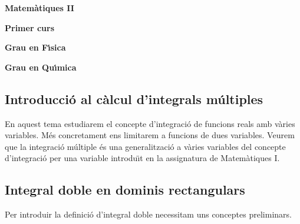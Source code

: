 \documentclass[12pt]{article}
\begin{document}
\vspace*{7cm}
\begin{center}
\textbf{\Huge{Matem{\`a}tiques II}}

\vspace*{2cm}\textbf{\LARGE{Primer curs}}

\vspace*{2cm}\textbf{\LARGE{Grau en F{\'\i}sica}}

\vspace*{0.6cm}\textbf{\LARGE{Grau en Qu{\'\i}mica}}
\end{center}

\thispagestyle{empty}

\newpage

%
%




\begin{center}
\section{Introducci{\'o} al c{\`a}lcul d'integrals m{\'u}ltiples}
\end{center}

\parskip =0.3cm
\parindent =0cm
\itemindent=2cm

En aquest tema estudiarem el concepte d'integraci{\'o} de funcions reals
amb v{\`a}ries variables. M{\'e}s concretament ens limitarem
a funcions de dues variables.
Veurem que la integraci{\'o} m{\'u}ltiple {\'e}s una generalitzaci{\'o} a
v{\`a}ries variables del concepte d'integraci{\'o} per una variable
introdu{\"\i}t en la assignatura de Matem{\`a}tiques I.

\vspace*{1cm}
\subsection{Integral doble en dominis rectangulars}

Per introduir la definici{\'o} d'integral doble necessitam uns conceptes
preliminars.
\end{document}
